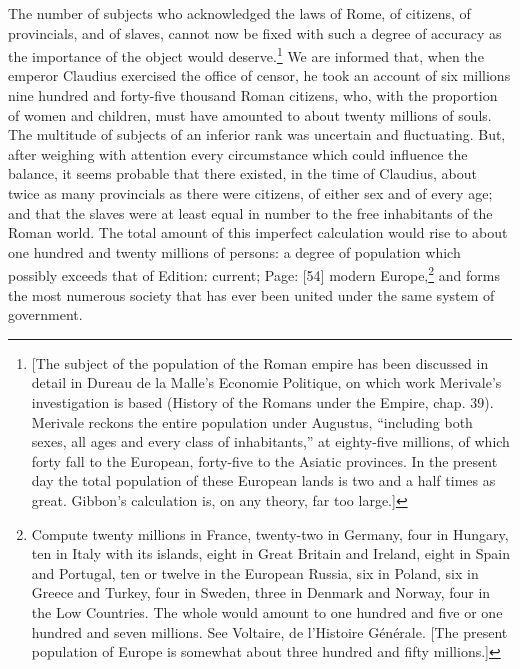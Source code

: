 The number of subjects who acknowledged the laws of Rome, of citizens, of provincials, and of slaves, cannot now be fixed with such a degree of accuracy as the importance of the object would deserve.\footnote{[The subject of the population of the Roman empire has been discussed in detail in Dureau de la Malle\texthebrew{}’s Economie Politique, on which work Merivale\texthebrew{}’s investigation is based (History of the Romans under the Empire, chap. 39). Merivale reckons the entire population under Augustus, \texthebrew{“}including both sexes, all ages and every class of inhabitants,\texthebrew{}” at eighty-five millions, of which forty fall to the European, forty-five to the Asiatic provinces. In the present day the total population of these European lands is two and a half times as great. Gibbon\texthebrew{}’s calculation is, on any theory, far too large.]} We are informed that, when the emperor Claudius exercised the office of censor, he took an account of six millions nine hundred and forty-five thousand Roman citizens, who, with the proportion of women and children, must have amounted to about twenty millions of souls. The multitude of subjects of an inferior rank was uncertain and fluctuating. But, after weighing with attention every circumstance which could influence the balance, it seems probable that there existed, in the time of Claudius, about twice as many provincials as there were citizens, of either sex and of every age; and that the slaves were at least equal in number to the free inhabitants of the Roman world. The total amount of this imperfect calculation would rise to about one hundred and twenty millions of persons: a degree of population which possibly exceeds that of Edition: current; Page: [54] modern Europe,\footnote{Compute twenty millions in France, twenty-two in Germany, four in Hungary, ten in Italy with its islands, eight in Great Britain and Ireland, eight in Spain and Portugal, ten or twelve in the European Russia, six in Poland, six in Greece and Turkey, four in Sweden, three in Denmark and Norway, four in the Low Countries. The whole would amount to one hundred and five or one hundred and seven millions. See Voltaire, de l\texthebrew{}’Histoire Générale. [The present population of Europe is somewhat about three hundred and fifty millions.]} and forms the most numerous society that has ever been united under the same system of government.

